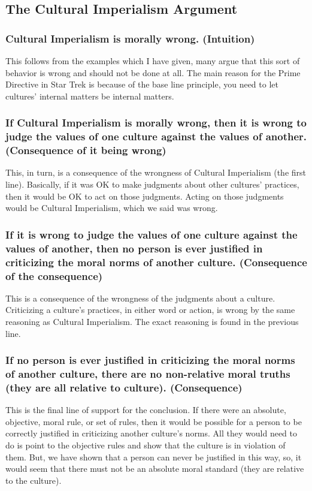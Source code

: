 \subsection{The Cultural Imperialism Argument}

\subsubsection{Cultural Imperialism is morally wrong. (Intuition)}
This follows from the examples which I have given, many argue that this sort of behavior is wrong and should not be done at all. The main reason for the Prime Directive in Star Trek is because of the base line principle, you need to let cultures' internal matters be internal matters. 
\subsubsection{If Cultural Imperialism is morally wrong, then it is wrong to judge the values of one culture against the values of another. (Consequence of it being wrong)}
This, in turn, is a consequence of the wrongness of Cultural Imperialism (the first line). Basically, if it was OK to make judgments about other cultures' practices, then it would be OK to act on those judgments. Acting on those judgments would be Cultural Imperialism, which we said was wrong.   
\subsubsection{If it is wrong to judge the values of one culture against the values of another, then no person is ever justified in criticizing the moral norms of another culture. (Consequence of the consequence)}
This is a consequence of the wrongness of the judgments about a culture. Criticizing a culture's practices, in either word or action, is wrong by the same reasoning as Cultural Imperialism. The exact reasoning is found in the previous line. 
\subsubsection{If no person is ever justified in criticizing the moral norms of another culture, there are no non-relative moral truths (they are all relative to culture). (Consequence)}
This is the final line of support for the conclusion. If there were an absolute, objective, moral rule, or set of rules, then it would be possible for a person to be correctly justified in criticizing another culture's norms. All they would need to do is point to the objective rules and show that the culture is in violation of them. But, we have shown that a person can never be justified in this way, so, it would seem that there must not be an absolute moral standard (they are relative to the culture).
